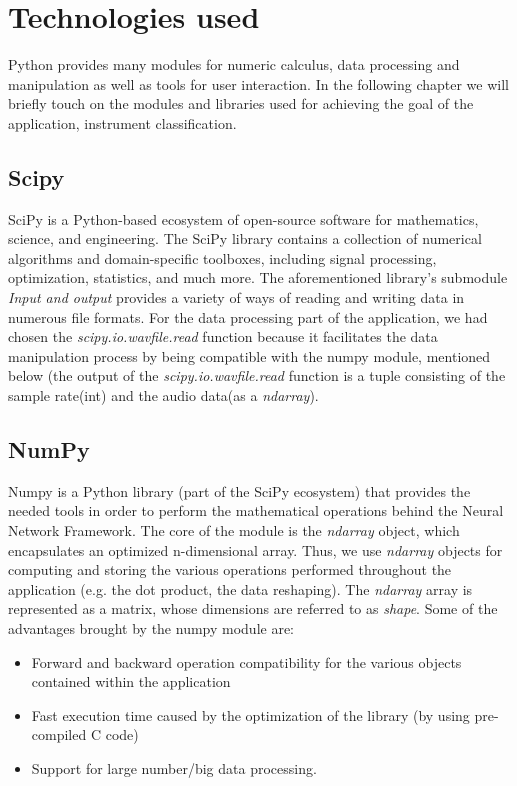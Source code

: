 \chapter{Technologies used}
Python provides many modules for numeric calculus, data processing and manipulation as  well as tools for user interaction.
In the following chapter we will briefly touch on the modules and libraries used for achieving the goal
of the application, instrument classification.

\section{Scipy}
SciPy is a Python-based ecosystem of open-source software for mathematics, science, and engineering. The SciPy library contains a collection of numerical algorithms and domain-specific toolboxes, including signal processing, optimization, statistics, and much more.\cite{scpd}
The aforementioned library's submodule \textit{Input and output} provides a variety of ways of reading and writing data in numerous file formats. For the data processing part of the application, we had chosen the \textit{scipy.io.wavfile.read} function because it facilitates the data manipulation process by being compatible with the numpy module, mentioned below (the output of the \textit{scipy.io.wavfile.read} function is a tuple consisting of the sample rate(int) and the audio data(as a \textit{ndarray}).
\section{NumPy}
Numpy is a Python library (part of the SciPy ecosystem) that provides the needed tools in order to perform the mathematical operations behind
the Neural Network Framework. The core of the module is the \textit{ndarray} object, which encapsulates an
optimized n-dimensional array. Thus, we use \textit{ndarray} objects for computing and storing the various
operations performed throughout the application (e.g. the dot product, the data reshaping). The \textit{ndarray}
array is represented as a matrix, whose dimensions are referred to as \textit{shape}.
Some of the advantages brought by the numpy module are:
\begin{itemize}
	\item Forward and backward operation compatibility for the various objects contained within the application
	\item Fast execution time caused by the optimization of the library \cite{npd} (by using pre-compiled C code)
	\item Support for large number/big data processing.
\end{itemize}

